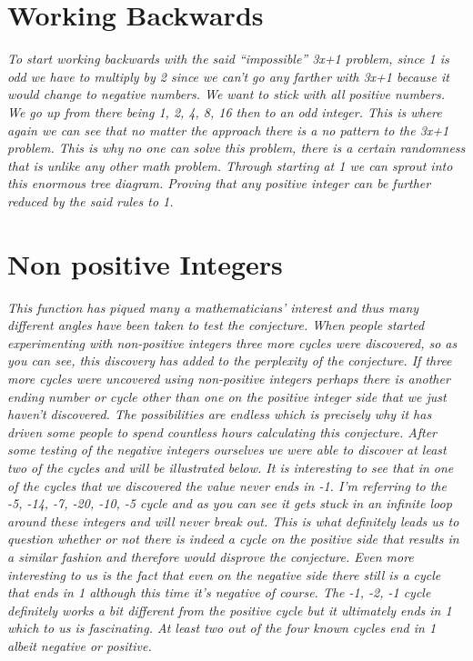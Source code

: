 \documentclass[10pt,english, openany]{book}
\begin{document}
\section{Working Backwards}
\textit{To start working backwards with the said “impossible” 3x+1 problem, since 1 is odd we have to multiply by 2 since we can’t go any farther with 3x+1 because it would change to negative numbers. We want to stick with all positive numbers. We go up from there being 1, 2, 4, 8, 16 then to an odd integer. This is where again we can see that no matter the approach there is a no pattern to the 3x+1 problem. This is why no one can solve this problem, there is a certain randomness that is unlike any other math problem. Through starting at 1 we can sprout into this enormous tree diagram. Proving that any positive integer can be further reduced by the said rules to 1.}

\section{Non positive Integers}
\textit{This function has piqued many a mathematicians’ interest and thus many different angles have been taken to test the conjecture. When people started experimenting with non-positive integers three more cycles were discovered, so as you can see, this discovery has added to the perplexity of the conjecture. If three more cycles were uncovered using non-positive integers perhaps there is another ending number or cycle other than one on the positive integer side that we just haven’t discovered. The possibilities are endless which is precisely why it has driven some people to spend countless hours calculating this conjecture. After some testing of the negative integers ourselves we were able to discover at least two of the cycles and will be illustrated below. It is interesting to see that in one of the cycles that we discovered the value never ends in -1. I’m referring to the -5, -14, -7, -20, -10, -5 cycle and as you can see it gets stuck in an infinite loop around these integers and will never break out. This is what definitely leads us to question whether or not there is indeed a cycle on the positive side that results in a similar fashion and therefore would disprove the conjecture. Even more interesting to us is the fact that even on the negative side there still is a cycle that ends in 1 although this time it’s negative of course. The -1, -2, -1 cycle definitely works a bit different from the positive cycle but it ultimately ends in 1 which to us is fascinating. At least two out of the four known cycles end in 1 albeit negative or positive.}
\end{document}
